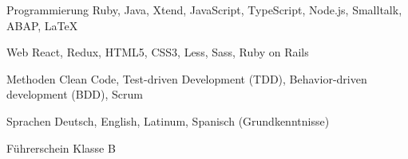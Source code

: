 

\begin{cvskills}

  \cvskill
    {Programmierung} %
    {Ruby, Java, Xtend, JavaScript, TypeScript, Node.js, Smalltalk, ABAP, \LaTeX} %

  \cvskill
    {Web} %
    {React, Redux, HTML5, CSS3, Less, Sass, Ruby on Rails} %


  \cvskill
    {Methoden} %
    {Clean Code, Test-driven Development (TDD), Behavior-driven development (BDD), Scrum} %

  \cvskill
    {Sprachen} %
    {Deutsch, English, Latinum, Spanisch (Grundkenntnisse)} %

  \cvskill
    {Führerschein} %
    {Klasse B} %

\end{cvskills}
